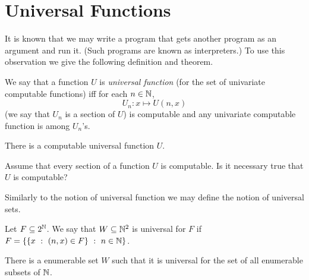 \chapter{Universal Functions}
It is known that we may write a program that gets another program as an argument
and run it. (Such programs are known as interpreters.) To use this observation
we give the following definition and theorem.
\begin{definition}
  We say that a function $U$ is \emph{universal function} (for the set of
  univariate computable functions) iff for each $n \in {\mathbb{N}}$,
  \[
    U_n : x \mapsto U(n, x)
  \]
  (we say that $U_n$ is a section of $U$)
  is computable and any univariate computable function is among $U_n$'s.
\end{definition}

\begin{theorem}
\label{theorem:universal-function-computable}
  There is a computable universal function $U$.
\end{theorem}

\begin{exercise}
  Assume that every section of a function $U$ is computable.
  Is it necessary true that $U$ is computable?
\end{exercise}

Similarly to the notion of universal function we may define the notion
of universal sets.
\begin{definition}
  Let $F \subseteq 2^{\mathbb{N}}$. We say that $W \subseteq {\mathbb{N}}^2$ is universal for $F$
  if $F = \set[n \in \N]{\set[(n, x) \in F]{x}}$.
\end{definition}

\begin{theorem}
  There is a enumerable set $W$ such that it is universal for the set of
  all enumerable subsets of ${\mathbb{N}}$.
\end{theorem}
%
